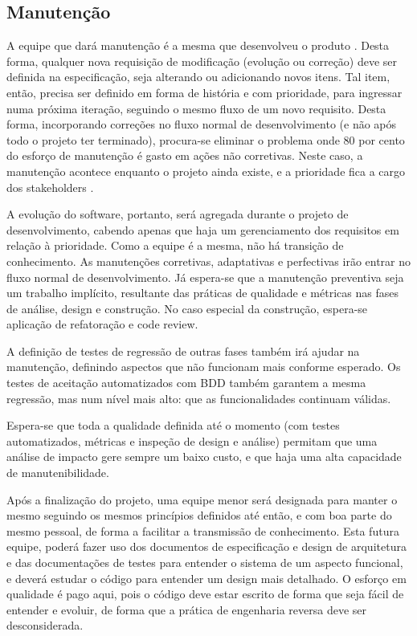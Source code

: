 \documentclass[12pt,journal,compsoc]{IEEEtran}
\begin{document}
\subsection{Manutenção}

A equipe que dará manutenção é a mesma que desenvolveu o produto \cite{fowler_products_not_projects}. Desta forma,
qualquer nova requisição de modificação (evolução ou correção) deve ser
definida na especificação, seja alterando ou adicionando novos itens. Tal item,
então, precisa ser definido em forma de história e com prioridade, para
ingressar numa próxima iteração, seguindo o mesmo fluxo de um novo requisito.
Desta forma, incorporando correções no fluxo normal de desenvolvimento (e não
após todo o projeto ter terminado), procura-se eliminar o problema onde 80 por
cento do esforço de manutenção é gasto em ações não corretivas. Neste caso, a
manutenção acontece enquanto o projeto ainda existe, e a prioridade fica a
cargo dos stakeholders \cite{schwaber_scrum_2013}. 

A evolução do software, portanto, será agregada durante o projeto de desenvolvimento, cabendo apenas que haja um gerenciamento dos requisitos em relação à prioridade. Como a equipe é a mesma, não há transição de conhecimento. As manutenções corretivas, adaptativas e perfectivas irão entrar no fluxo normal de desenvolvimento. Já espera-se que a manutenção preventiva seja um trabalho implícito, resultante das práticas de qualidade e métricas nas fases de análise, design e construção. No caso especial da construção, espera-se aplicação de refatoração e code review.

A definição de testes de regressão de outras fases também irá ajudar na manutenção, definindo aspectos que não funcionam mais conforme esperado. Os testes de aceitação automatizados com BDD também garantem a mesma regressão, mas num nível mais alto: que as funcionalidades continuam válidas. 

Espera-se que toda a qualidade definida até o momento (com testes automatizados, métricas e inspeção de design e análise) permitam que uma análise de impacto gere sempre um baixo custo, e que haja uma alta capacidade de manutenibilidade. 

Após a finalização do projeto, uma equipe menor será designada para manter o mesmo seguindo os mesmos princípios definidos até então, e com boa parte do mesmo pessoal, de forma a facilitar a transmissão de conhecimento. Esta futura equipe, poderá fazer uso dos documentos de especificação e design de arquitetura e das documentações de testes para entender o sistema de um aspecto funcional, e deverá estudar o código para entender um design mais detalhado. O esforço em qualidade é pago aqui, pois o código deve estar escrito de forma que seja fácil de entender e evoluir, de forma que a prática de engenharia reversa deve ser desconsiderada. 
\end{document}
